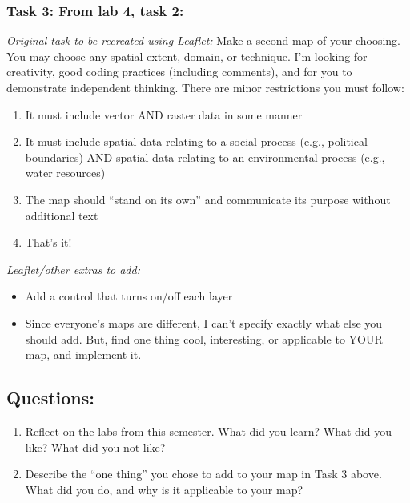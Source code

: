 \documentclass[]{article}
\begin{document}
\subsubsection{Task 3: From lab 4, task
2:}\label{task-3-from-lab-4-task-2}

\emph{Original task to be recreated using Leaflet:} Make a second map of
your choosing. You may choose any spatial extent, domain, or technique.
I'm looking for creativity, good coding practices (including comments),
and for you to demonstrate independent thinking. There are minor
restrictions you must follow:

\begin{enumerate}
\def\labelenumi{\arabic{enumi}.}
\item
  It must include vector AND raster data in some manner
\item
  It must include spatial data relating to a social process (e.g.,
  political boundaries) AND spatial data relating to an environmental
  process (e.g., water resources)
\item
  The map should ``stand on its own'' and communicate its purpose
  without additional text
\item
  That's it!
\end{enumerate}

\emph{Leaflet/other extras to add:}

\begin{itemize}
\item
  Add a control that turns on/off each layer
\item
  Since everyone's maps are different, I can't specify exactly what else
  you should add. But, find one thing cool, interesting, or applicable
  to YOUR map, and implement it.
\end{itemize}

\subsection{\texorpdfstring{\textbf{Questions:}}{Questions:}}\label{questions}

\begin{enumerate}
\def\labelenumi{\arabic{enumi}.}
\item
  Reflect on the labs from this semester. What did you learn? What did
  you like? What did you not like?
\item
  Describe the ``one thing'' you chose to add to your map in Task 3
  above. What did you do, and why is it applicable to your map?
\end{enumerate}
\end{document}
